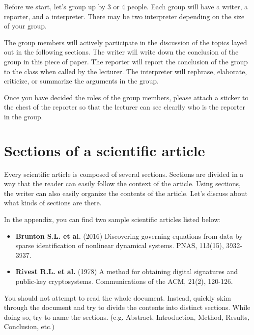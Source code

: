 \documentclass{article}
\begin{document}
Before we start, let's group up by 3 or 4 people.
Each group will have a writer, a reporter, and a interpreter.
There may be two interpreter depending on the size of your group.

The group members will actively participate in the discussion of the topics layed out in the following sections.
The writer will write down the conclusion of the group in this piece of paper.
The reporter will report the conclusion of the group to the class when called by the lecturer.
The interpreter will rephrase, elaborate, criticize, or summarize the arguments in the group.

Once you have decided the roles of the group members, please attach a sticker to the chest of the reporter so that the lecturer can see clearlly who is the reporter in the group.


\newpage
\section{Sections of a scientific article}

Every scientific article is composed of several sections.
Sections are divided in a way that the reader can easily follow the context of the article.
Using sections, the writer can also easily organize the contents of the article.
Let's discuss about what kinds of sections are there.

In the appendix, you can find two sample scientific articles listed below:
\begin{itemize}
    \item \textbf{Brunton S.L. et al.} (2016) Discovering governing equations from data by sparse identification of nonlinear dynamical systems. PNAS, 113(15), 3932-3937.
    \item \textbf{Rivest R.L. et al.} (1978) A method for obtaining digital signatures and public-key cryptosystems. Communications of the ACM, 21(2), 120-126.
\end{itemize}
You should not attempt to read the whole document.
Instead, quickly skim through the document and try to divide the contents into distinct sections.
While doing so, try to name the sections. (e.g. Abstract, Introduction, Method, Results, Conclusion, etc.) 
\end{document}
